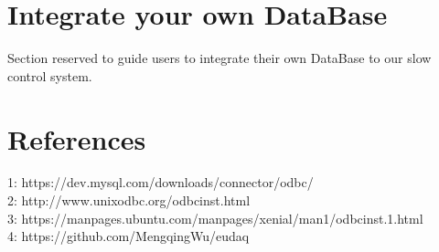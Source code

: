 \documentclass[a4paper,12pt]{scrartcl}
\begin{document}
\section{Integrate your own DataBase}
Section reserved to guide users to integrate their own DataBase to our slow control system.

\pagebreak
\section{References}
1: https://dev.mysql.com/downloads/connector/odbc/ \\
2: http://www.unixodbc.org/odbcinst.html \\
3: https://manpages.ubuntu.com/manpages/xenial/man1/odbcinst.1.html \\
4: https://github.com/MengqingWu/eudaq \\
\end{document}
